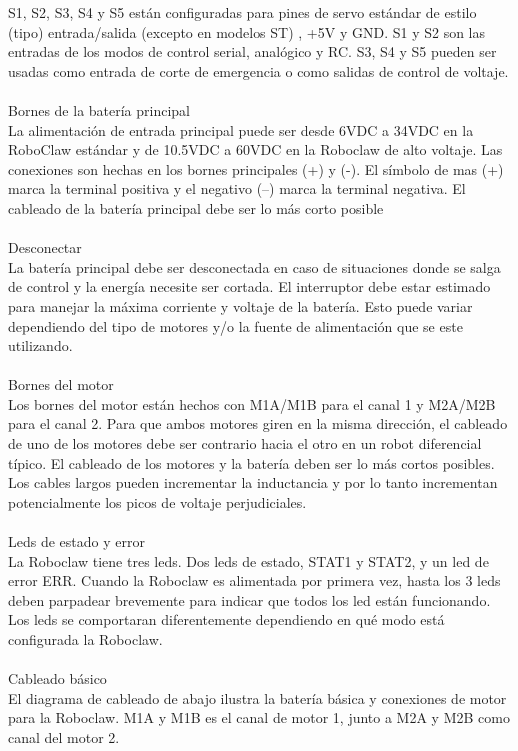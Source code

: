 \documentclass[user_manual.tex]{subfiles}
\begin{document}
S1, S2, S3, S4 y S5 están configuradas para pines de servo estándar de estilo (tipo) entrada/salida (excepto en modelos ST)
, +5V y GND. S1 y S2 son las entradas  de los modos de control serial, analógico y RC. S3, S4 y S5 pueden ser usadas como
entrada de corte de emergencia o como salidas de control de voltaje.\\
\\
Bornes de la batería principal\\
La alimentación de entrada principal puede ser desde 6VDC a 34VDC en la RoboClaw estándar y de 10.5VDC a 60VDC en la Roboclaw
de alto voltaje. Las conexiones son hechas en los bornes principales (+) y (-). El símbolo de mas (+) marca la terminal
positiva y el negativo (–) marca la terminal negativa. El cableado de la batería principal debe ser lo más corto posible \\
\\
Desconectar\\
La batería principal debe ser desconectada en caso de situaciones donde se salga de control y la energía necesite ser
cortada. El interruptor debe estar estimado para manejar la máxima corriente y voltaje de la batería. Esto puede variar
dependiendo del tipo de motores y/o la fuente de alimentación que se este utilizando.\\
\\
Bornes del motor\\
Los bornes del motor están hechos con M1A/M1B para el canal 1 y M2A/M2B para el canal 2. Para que ambos motores giren en
la misma dirección, el cableado de uno de los motores debe ser contrario hacia el otro en un robot diferencial típico. El
cableado de los motores y la batería deben ser lo más cortos posibles. Los cables largos pueden incrementar la inductancia
y por lo tanto incrementan potencialmente los picos de voltaje perjudiciales.\\
\\
Leds de estado y error\\
La Roboclaw tiene tres leds. Dos leds de estado, STAT1 y STAT2, y un led de error ERR. Cuando la Roboclaw es alimentada por
primera vez, hasta los 3 leds deben parpadear brevemente para indicar que todos los led están funcionando. Los leds se
comportaran diferentemente dependiendo en qué modo está configurada la Roboclaw.\\
\\
Cableado básico\\
El diagrama de cableado de abajo ilustra la batería básica y conexiones de motor para la Roboclaw. M1A y M1B es el canal
de motor 1, junto a M2A y M2B como canal del motor 2.\\
\end{document}
